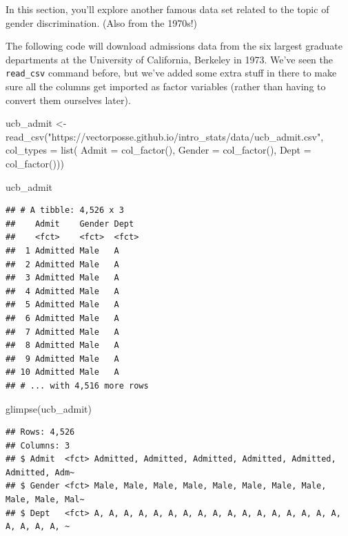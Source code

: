 \documentclass[
]{book}
\newenvironment{Shaded}{\begin{snugshade}}{\end{snugshade}}
\newcommand{\AttributeTok}[1]{\textcolor[rgb]{0.77,0.63,0.00}{#1}}
\newcommand{\FunctionTok}[1]{\textcolor[rgb]{0.00,0.00,0.00}{#1}}
\newcommand{\NormalTok}[1]{#1}
\newcommand{\OtherTok}[1]{\textcolor[rgb]{0.56,0.35,0.01}{#1}}
\newcommand{\StringTok}[1]{\textcolor[rgb]{0.31,0.60,0.02}{#1}}
\begin{document}
In this section, you'll explore another famous data set related to the topic of gender discrimination. (Also from the 1970s!)

The following code will download admissions data from the six largest graduate departments at the University of California, Berkeley in 1973. We've seen the \texttt{read\_csv} command before, but we've added some extra stuff in there to make sure all the columns get imported as factor variables (rather than having to convert them ourselves later).

\begin{Shaded}
\begin{Highlighting}[]
\NormalTok{ucb\_admit }\OtherTok{\textless{}{-}} \FunctionTok{read\_csv}\NormalTok{(}\StringTok{"https://vectorposse.github.io/intro\_stats/data/ucb\_admit.csv"}\NormalTok{,}
                      \AttributeTok{col\_types =} \FunctionTok{list}\NormalTok{(}
                          \AttributeTok{Admit =} \FunctionTok{col\_factor}\NormalTok{(),}
                          \AttributeTok{Gender =} \FunctionTok{col\_factor}\NormalTok{(),}
                          \AttributeTok{Dept =} \FunctionTok{col\_factor}\NormalTok{()))}
\end{Highlighting}
\end{Shaded}

\begin{Shaded}
\begin{Highlighting}[]
\NormalTok{ucb\_admit}
\end{Highlighting}
\end{Shaded}

\begin{verbatim}
## # A tibble: 4,526 x 3
##    Admit    Gender Dept 
##    <fct>    <fct>  <fct>
##  1 Admitted Male   A    
##  2 Admitted Male   A    
##  3 Admitted Male   A    
##  4 Admitted Male   A    
##  5 Admitted Male   A    
##  6 Admitted Male   A    
##  7 Admitted Male   A    
##  8 Admitted Male   A    
##  9 Admitted Male   A    
## 10 Admitted Male   A    
## # ... with 4,516 more rows
\end{verbatim}

\begin{Shaded}
\begin{Highlighting}[]
\FunctionTok{glimpse}\NormalTok{(ucb\_admit)}
\end{Highlighting}
\end{Shaded}

\begin{verbatim}
## Rows: 4,526
## Columns: 3
## $ Admit  <fct> Admitted, Admitted, Admitted, Admitted, Admitted, Admitted, Adm~
## $ Gender <fct> Male, Male, Male, Male, Male, Male, Male, Male, Male, Male, Mal~
## $ Dept   <fct> A, A, A, A, A, A, A, A, A, A, A, A, A, A, A, A, A, A, A, A, A, ~
\end{verbatim}
\end{document}
